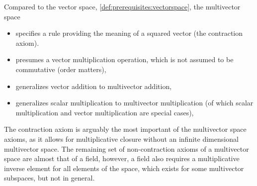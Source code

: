 Compared to the vector space, \cref{def:prerequisites:vectorspace}, the multivector space

\begin{itemize}
\item specifies a rule providing the meaning of a squared vector (the contraction axiom).
\item presumes a vector multiplication operation, which is not assumed to be commutative (order matters),
\item generalizes vector addition to multivector addition,
\item generalizes scalar multiplication to multivector multiplication (of which scalar multiplication and vector multiplication are special cases),
\end{itemize}

The contraction axiom is arguably the most important of the multivector space axioms, as it allows for multiplicative closure without an infinite dimensional multivector space.
The remaining set of non-contraction axioms of a multivector space are almost that of a field, however,
a field also requires a multiplicative inverse element for all elements of the space, which exists for some multivector subspaces, but not in general.


